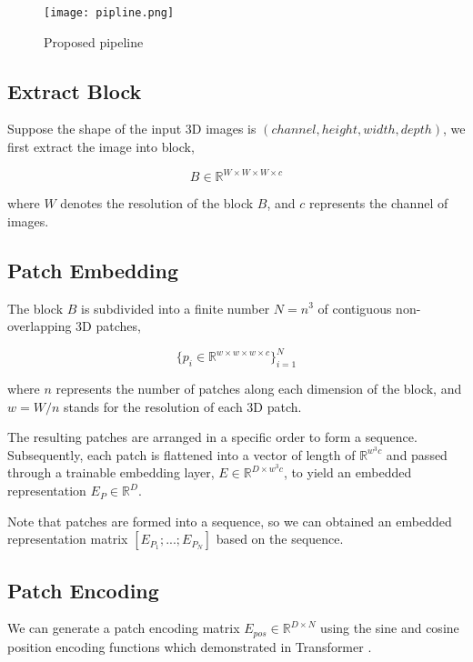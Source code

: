 \documentclass{article}
\begin{document}
\begin{figure}
    \centering
    \texttt{[image: pipline.png]} 
    \caption{Proposed pipeline}
    \label{fig:2}
\end{figure}

\subsection{Extract Block}

Suppose the shape of the input 3D images is $(channel,height,width,depth)$, we first extract the image into block,

\begin{equation}
  B \in \mathbb{R}^{W \times W \times W \times c}
  \label{eq:1}
\end{equation}

where  $W$ denotes the resolution of the block $B$, and $c$ represents the channel of images.

\subsection{Patch Embedding}

The block $B$ is subdivided into a finite number $ N = n^3$ of contiguous non-overlapping 3D patches,

\begin{equation}
  \{p_i \in \mathbb{R}^{w \times w \times w \times c}\}_{i=1}^N
  \label{eq:2}
\end{equation}

where $n$ represents the number of patches along each dimension of the block, and $ w = W/n $ stands for the resolution of each 3D patch.

The resulting patches are arranged in a specific order to form a sequence. Subsequently, each patch is flattened into a vector of length of $\mathbb{R}^{w^3c}$ and passed through a trainable embedding layer, $E \in \mathbb{R}^{D \times w^3c}$, to yield an embedded representation $E_P \in \mathbb{R}^{D}$.

Note that patches are formed into a sequence, so we can obtained an embedded representation matrix $[E_{P_1};...;E_{P_N}]$ based on the sequence. 

\subsection{Patch Encoding}

We can generate a patch encoding matrix $E_{pos} \in \mathbb{R}^{D \times N}$ using the sine and cosine position encoding functions which demonstrated in Transformer \cite{16}.
\end{document}
